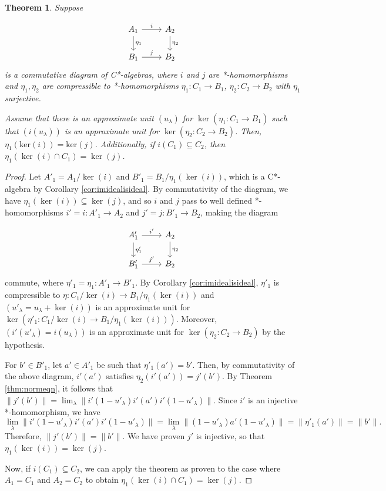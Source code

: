 \documentclass[a4paper, 12pt]{amsart}
\newtheorem{thm}{Theorem}[section]
\theoremstyle{definition}
\theoremstyle{remark}
\numberwithin{equation}{section}
\begin{document}
\begin{thm}
\label{thm:kernelsurjects}
    Suppose 

    $$
\begin{tikzcd}
A_{1} \arrow[r, "i"] \arrow[d, "\eta_{1}"] & A_{2} \arrow[d, "\eta_{2}"] \\
B_{1} \arrow[r, "j"]                       & B_{2}                      
\end{tikzcd}$$ is a commutative diagram of C*-algebras, where $i$ and $j$ are *-homomorphisms and $\eta_{1},\eta_{2}$ are compressible to *-homomorphisms $\eta_{1}:C_{1}\to B_{1}$, $\eta_{2}:C_{2}\to B_{2}$ with $\eta_{1}$ surjective.

Assume that there is an approximate unit $(u_{\lambda})$ for $\ker(\eta_{1}:C_{1}\to B_{1})$ such that $(i(u_{\lambda}))$ is an approximate unit for $\ker(\eta_{2}:C_{2}\to B_{2})$. Then, $\eta_{1}(\text{ker}(i)) = \text{ker}(j)$. Additionally, if $i(C_{1})\subseteq C_{2}$, then $\eta_{1}(\ker(i)\cap C_{1}) = \ker(j)$.
\end{thm}

\begin{proof}
Let $A'_{1} = A_{1}/\ker(i)$ and $B'_{1} = B_{1}/\eta_{1}(\ker(i))$, which is a C*-algebra by Corollary \ref{cor:imidealisideal}. By commutativity of the diagram, we have $\eta_{1}(\ker(i))\subseteq \ker(j)$, and so $i$ and $j$ pass to well defined *-homomorphisms $i' = i:A'_{1}\to A_{2}$ and $j' = j:B'_{1}\to B_{2}$, making the diagram 

$$
\begin{tikzcd}
A'_{1} \arrow[r, "i'"] \arrow[d, "\eta'_{1}"] & A_{2} \arrow[d, "\eta_{2}"] \\
B'_{1} \arrow[r, "j'"]                        & B_{2}                      
\end{tikzcd}$$ commute, where $\eta'_{1} = \eta_{1}:A'_{1}\to B'_{1}$. By Corollary \ref{cor:imidealisideal}, $\eta'_{1}$ is compressible to $\eta:C_{1}/\ker(i)\to B_{1}/\eta_{1}(\ker(i))$ and $(u'_{\lambda} = u_{\lambda} + \ker(i))$ is an approximate unit for $\ker(\eta'_{1}:C_{1}/\ker(i)\to B_{1}/\eta_{1}(\ker(i)))$. Moreover, $(i'(u'_{\lambda}) = i(u_{\lambda}))$ is an approximate unit for $\ker(\eta_{2}:C_{2}\to B_{2})$ by the hypothesis.

For $b'\in B'_{1}$, let $a'\in A'_{1}$ be such that $\eta'_{1}(a') = b'$. Then, by commutativity of the above diagram, $i'(a')$ satisfies $\eta_{2}(i'(a')) = j'(b')$. By Theorem \ref{thm:normeqn}, it follows that $\|j'(b')\| = \lim_{\lambda}\|i'(1-u'_{\lambda})i'(a')i'(1-u'_{\lambda})\|$. Since $i'$ is an injective *-homomorphism, we have $$\lim_{\lambda}\|i'(1-u'_{\lambda})i'(a')i'(1-u'_{\lambda})\| = \lim_{\lambda}\|(1-u'_{\lambda})a'(1-u'_{\lambda})\| = \|\eta'_{1}(a')\| = \|b'\|.$$ Therefore, $\|j'(b')\| = \|b'\|$. We have proven $j'$ is injective, so that $\eta_{1}(\ker(i)) = \ker(j)$.

Now, if $i(C_{1})\subseteq C_{2}$, we can apply the theorem as proven to the case where $A_{1} = C_{1}$ and $A_{2} = C_{2}$ to obtain $\eta_{1}(\ker(i)\cap C_{1}) = \ker(j)$.
\end{proof}
\end{document}
